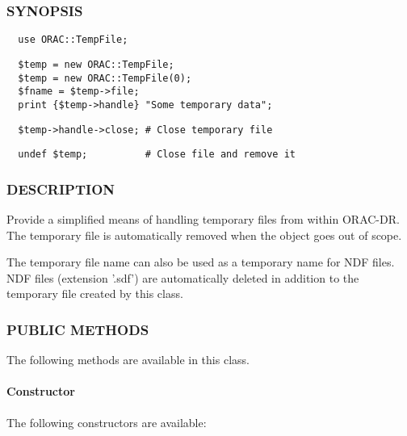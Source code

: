 \subsubsection*{SYNOPSIS\label{ORAC::TempFile_SYNOPSIS}}\begin{verbatim}
  use ORAC::TempFile;
\end{verbatim}
\begin{verbatim}
  $temp = new ORAC::TempFile;
  $temp = new ORAC::TempFile(0);
  $fname = $temp->file;
  print {$temp->handle} "Some temporary data";
\end{verbatim}
\begin{verbatim}
  $temp->handle->close; # Close temporary file
\end{verbatim}
\begin{verbatim}
  undef $temp;          # Close file and remove it
\end{verbatim}
\subsubsection*{DESCRIPTION\label{ORAC::TempFile_DESCRIPTION}}

Provide a simplified means of handling temporary files from within
ORAC-DR. The temporary file is automatically removed when the
object goes out of scope.



The temporary file name can also be used as a temporary name for
NDF files. NDF files (extension '.sdf') are automatically deleted
in addition to the temporary file created by this class.

\subsubsection*{PUBLIC METHODS\label{ORAC::TempFile_PUBLIC_METHODS}}

The following methods are available in this class.

\paragraph*{Constructor\label{ORAC::TempFile_Constructor}}

The following constructors are available:

